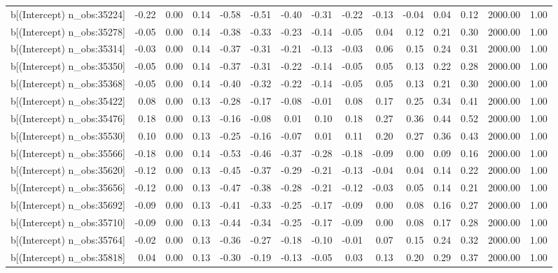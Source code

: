 \begin{table}[ht]
\begin{tabular}{rrrrrrrrrrrrrrr}
  b[(Intercept) n\_obs:35224] & -0.22 & 0.00 & 0.14 & -0.58 & -0.51 & -0.40 & -0.31 & -0.22 & -0.13 & -0.04 & 0.04 & 0.12 & 2000.00 & 1.00 \\ 
  b[(Intercept) n\_obs:35278] & -0.05 & 0.00 & 0.14 & -0.38 & -0.33 & -0.23 & -0.14 & -0.05 & 0.04 & 0.12 & 0.21 & 0.30 & 2000.00 & 1.00 \\ 
  b[(Intercept) n\_obs:35314] & -0.03 & 0.00 & 0.14 & -0.37 & -0.31 & -0.21 & -0.13 & -0.03 & 0.06 & 0.15 & 0.24 & 0.31 & 2000.00 & 1.00 \\ 
  b[(Intercept) n\_obs:35350] & -0.05 & 0.00 & 0.14 & -0.37 & -0.31 & -0.22 & -0.14 & -0.05 & 0.05 & 0.13 & 0.22 & 0.28 & 2000.00 & 1.00 \\ 
  b[(Intercept) n\_obs:35368] & -0.05 & 0.00 & 0.14 & -0.40 & -0.32 & -0.22 & -0.14 & -0.05 & 0.05 & 0.13 & 0.21 & 0.30 & 2000.00 & 1.00 \\ 
  b[(Intercept) n\_obs:35422] & 0.08 & 0.00 & 0.13 & -0.28 & -0.17 & -0.08 & -0.01 & 0.08 & 0.17 & 0.25 & 0.34 & 0.41 & 2000.00 & 1.00 \\ 
  b[(Intercept) n\_obs:35476] & 0.18 & 0.00 & 0.13 & -0.16 & -0.08 & 0.01 & 0.10 & 0.18 & 0.27 & 0.36 & 0.44 & 0.52 & 2000.00 & 1.00 \\ 
  b[(Intercept) n\_obs:35530] & 0.10 & 0.00 & 0.13 & -0.25 & -0.16 & -0.07 & 0.01 & 0.11 & 0.20 & 0.27 & 0.36 & 0.43 & 2000.00 & 1.00 \\ 
  b[(Intercept) n\_obs:35566] & -0.18 & 0.00 & 0.14 & -0.53 & -0.46 & -0.37 & -0.28 & -0.18 & -0.09 & 0.00 & 0.09 & 0.16 & 2000.00 & 1.00 \\ 
  b[(Intercept) n\_obs:35620] & -0.12 & 0.00 & 0.13 & -0.45 & -0.37 & -0.29 & -0.21 & -0.13 & -0.04 & 0.04 & 0.14 & 0.22 & 2000.00 & 1.00 \\ 
  b[(Intercept) n\_obs:35656] & -0.12 & 0.00 & 0.13 & -0.47 & -0.38 & -0.28 & -0.21 & -0.12 & -0.03 & 0.05 & 0.14 & 0.21 & 2000.00 & 1.00 \\ 
  b[(Intercept) n\_obs:35692] & -0.09 & 0.00 & 0.13 & -0.41 & -0.33 & -0.25 & -0.17 & -0.09 & 0.00 & 0.08 & 0.16 & 0.27 & 2000.00 & 1.00 \\ 
  b[(Intercept) n\_obs:35710] & -0.09 & 0.00 & 0.13 & -0.44 & -0.34 & -0.25 & -0.17 & -0.09 & 0.00 & 0.08 & 0.17 & 0.28 & 2000.00 & 1.00 \\ 
  b[(Intercept) n\_obs:35764] & -0.02 & 0.00 & 0.13 & -0.36 & -0.27 & -0.18 & -0.10 & -0.01 & 0.07 & 0.15 & 0.24 & 0.32 & 2000.00 & 1.00 \\ 
  b[(Intercept) n\_obs:35818] & 0.04 & 0.00 & 0.13 & -0.30 & -0.19 & -0.13 & -0.05 & 0.03 & 0.13 & 0.20 & 0.29 & 0.37 & 2000.00 & 1.00 \\ 

\end{tabular}
\end{table}
